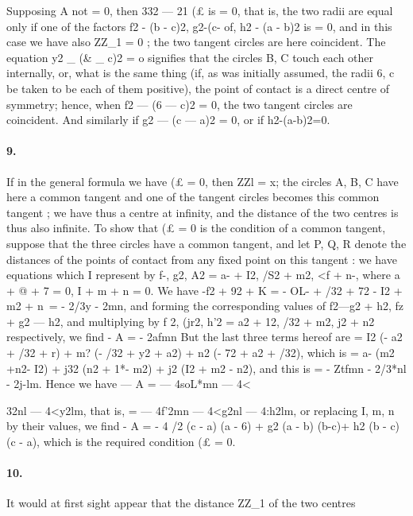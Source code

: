 \documentclass[11pt,a4paper]{book}
\begin{document}
{Supposing  A  not  =  0,  then  332  ---  21  (£  is  =  0,  that  is,  the  two  radii  are  equal
only  if  one  of  the  factors  f2  -  (b  -  c)2,  g2-(c-  of,  h2  -  (a  -  b)2  is  =  0,  and  in  this
case  we  have  also  ZZ_1  =  0  ;  the  two  tangent  circles  are  here  coincident.  The  equation
y2  \_  (\&  \_  c)2  =  o  signifies  that  the  circles  B,  C  touch  each  other  internally,  or,  what  is
the  same  thing  (if,  as  was  initially  assumed,  the  radii  6,  c  be  taken  to  be  each  of
them  positive),  the  point  of  contact  is  a  direct  centre  of  symmetry;  hence,  when
f2  ---  (6  ---  c)2  =  0,  the  two  tangent  circles  are  coincident.  And  similarly  if  g2  ---  (c  ---  a)2  =  0,
or  if  h2-(a-b)2=0.
\paragraph{9.} If  in  the  general  formula  we  have  (£  =  0,  then  ZZl  =  x;  the  circles  A,  B,  C
have  here  a  common  tangent  and  one  of  the  tangent  circles  becomes  this  common
tangent  ;  we  have  thus  a  centre  at  infinity,  and  the  distance  of  the  two  centres  is
thus  also  infinite.
To  show  that  (£  =  0  is  the  condition  of  a  common  tangent,  suppose  that  the
three  circles  have  a  common  tangent,  and  let  P,  Q,  R  denote  the  distances  of  the
points  of  contact  from  any  fixed  point  on  this  tangent  :  we  have
equations   which   I   represent   by  f-,  g2,  A2  =  a-  +  I2,   /S2  +  m2,   <f  +  n-,    where   a  +  @  +  7  =  0,
I  +  m  +  n  =  0.     We  have
-f2  +  92  +  K  =  -  OL-  +  /32  +  72  -  I2  +  m2  +  n\  =  -  2/3y  -  2mn,
and    forming    the    corresponding    values    of  f2---g2  +  h2,  fz  +  g2  ---  h2,    and    multiplying   by
f  2,  (jr2,  h'2  =  a2  +  12,  /32  +  m2,  j2  +  n2  respectively,  we  find
-  A  =  -  2afmn
But  the  last  three  terms  hereof  are
=  I2  (-  a2  +  /32  +  r)  +  m?  (-  /32  +  y2  +  a2)  +  n2  (-  72  +  a2  +  /32),
which  is
=  a-  (m2  +n2-  I2)  +  j32  (n2  +  1*-  m2)  +  j2  (I2  +  m2  -  n2),
and  this  is
=  -  Ztfmn  -  2/3*nl  -  2j-lm.
Hence  we  have
---  A  =  ---  4soL*mn  ---  4<{32nl  ---  4<y2lm,
that  is,
=  ---  4f'2mn  ---  4<g2nl  ---  4:h2lm,
or  replacing  I,  m,  n  by  their  values,  we  find
-  A  =  -  4  {/2  (c  -  a)  (a  -  6)  +  g2  (a  -  b)  (b-c)+  h2  (b  -  c)  (c  -  a)},
which  is  the  required  condition  (£  =  0.
\paragraph{10.} It    would    at    first    sight    appear    that    the    distance    ZZ_1    of    the    two   centres


}}
\end{document}
